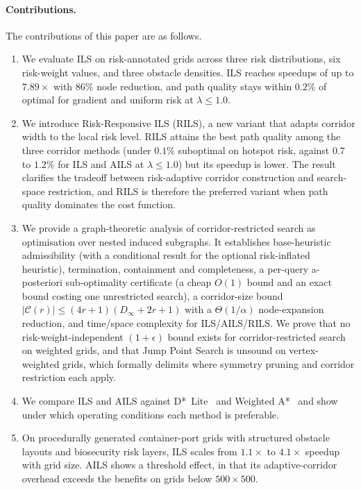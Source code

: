 \documentclass[preprint,12pt,authoryear]{elsarticle}
\begin{document}
\paragraph{Contributions.}
The contributions of this paper are as follows.

\begin{enumerate}
\item We evaluate ILS on risk-annotated grids across three risk distributions, six risk-weight values, and three obstacle densities. ILS reaches speedups of up to $7.89\times$ with $86\%$ node reduction, and path quality stays within $0.2\%$ of optimal for gradient and uniform risk at $\lambda \leq 1.0$.

\item We introduce Risk-Responsive ILS (RILS), a new variant that adapts corridor width to the local risk level. RILS attains the best path quality among the three corridor methods (under $0.1\%$ suboptimal on hotspot risk, against $0.7$ to $1.2\%$ for ILS and AILS at $\lambda \leq 1.0$) but its speedup is lower. The result clarifies the tradeoff between risk-adaptive corridor construction and search-space restriction, and RILS is therefore the preferred variant when path quality dominates the cost function.

\item We provide a graph-theoretic analysis of corridor-restricted search as optimisation over nested induced subgraphs. It establishes base-heuristic admissibility (with a conditional result for the optional risk-inflated heuristic), termination, containment and completeness, a per-query a-posteriori sub-optimality certificate (a cheap $O(1)$ bound and an exact bound costing one unrestricted search), a corridor-size bound $|\mathcal{C}(r)| \leq (4r+1)(D_\infty+2r+1)$ with a $\Theta(1/\alpha)$ node-expansion reduction, and time/space complexity for ILS/AILS/RILS. We prove that no risk-weight-independent $(1+\epsilon)$ bound exists for corridor-restricted search on weighted grids, and that Jump Point Search is unsound on vertex-weighted grids, which formally delimits where symmetry pruning and corridor restriction each apply.

\item We compare ILS and AILS against D*~Lite~\citep{Koenig2002} and Weighted A*~\citep{Pohl1970} and show under which operating conditions each method is preferable.

\item On procedurally generated container-port grids with structured obstacle layouts and biosecurity risk layers, ILS scales from $1.1\times$ to $4.1\times$ speedup with grid size. AILS shows a threshold effect, in that its adaptive-corridor overhead exceeds the benefits on grids below $500 \times 500$.


\end{enumerate}
\end{document}
